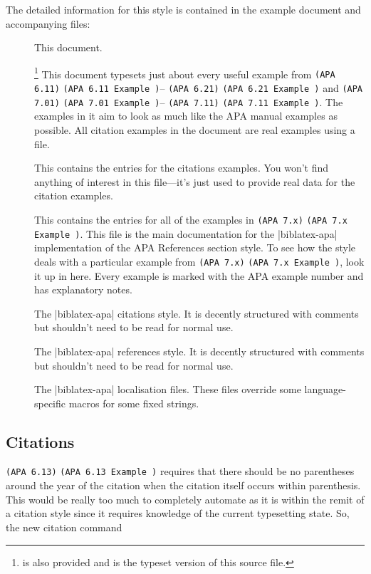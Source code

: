\documentclass{ltxdockit}
\newcommand\apa[2][]{\ifthenelse{\equal{#1}{}}%
                       {\texttt{(APA #2)}}%
                       {\texttt{(APA #2 Example #1)}}}
\begin{document}
The detailed information for this style is contained in the example document and
accompanying  files:
\begin{description}
\item[] This document.
\item[]\footnote{
    is also provided and is the typeset version of this \latex source
    file.} This document typesets just about every useful example from
  \apa{6.11}--\apa{6.21} and \apa{7.01}--\apa{7.11}. The examples in it
  aim to look as much like the APA manual examples as possible. All
  citation examples in the document are real examples using a 
  file.
\item[] This contains the 
  entries for the citations examples. You won't find anything of interest
  in this file---it's just used to provide real data for the citation
  examples.
\item[] This contains the
   entries for all of the examples in \apa{7.x}. This file is
  the main documentation for the |biblatex-apa| implementation of the APA
  References section style. To see how the style deals with a particular
  example from \apa{7.x}, look it up in here. Every example is marked with
  the APA example number and has explanatory notes.
\item[] The |biblatex-apa| citations style. It is
  decently structured with comments but shouldn't need to be read for
  normal use.
\item[] The |biblatex-apa| references style. It is
  decently structured with comments but shouldn't need to be read for
  normal use.
\item[] The |biblatex-apa| localisation files. These files
  override some language-specific macros for some fixed strings.
\end{description}

\subsection{Citations}

\apa{6.13} requires that there should be no parentheses around the year of
the citation when the citation itself occurs within parenthesis. This would
be really too much to completely automate as it is within the remit of a
citation style since it requires knowledge of the current typesetting
state. So, the new citation command
\end{document}
